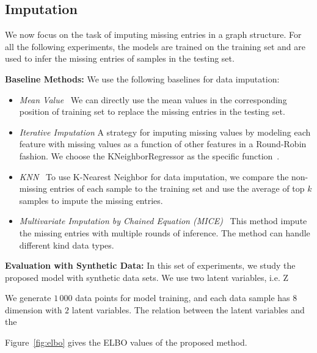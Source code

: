 \documentclass{article} %
\newcommand{\belhal}[1]{{\color{red}{\bf\sf [BK: #1]}}}
\begin{document}
\subsection{Imputation}
We now focus on the task of imputing missing entries in a graph structure.
For all the following experiments, the models are trained on the training set and are used to infer the missing entries of samples in the testing set.

\textbf{Baseline Methods:} We use the following baselines for data imputation:
\begin{itemize}
\item \textit{Mean Value} \ We can directly use the mean values in the corresponding position of training set to replace the missing entries in the testing set.  
\item \textit{Iterative Imputation} A strategy for imputing missing values by modeling each feature with missing values as a function of other features in a Round-Robin fashion. 
\belhal{Don't need to cite sklearn here I believe. To confirm.} 
We choose the KNeighborRegressor as the specific function~\citep{scikit-learn}.
\item \textit{KNN} \  To use K-Nearest Neighbor for data imputation,  we compare the non-missing entries of each sample to the training set and use the  average of top $k$ samples to impute the missing entries. 
\item \textit{Multivariate Imputation by Chained Equation (MICE)} \ This method impute the missing entries with multiple  rounds of inference. The method can handle different kind data types.
\end{itemize}
\textbf{Evaluation with Synthetic Data: }
In this set of experiments, we study the proposed model with synthetic data sets.
We use two latent variables, i.e. Z

We generate $1\,000$ data points for model training, and each data sample  has $8$ dimension with $2$ latent variables.  The relation between the latent variables and the \belhal{to complete}


Figure~\ref{fig:elbo} gives the ELBO values of the proposed method. 
\end{document}
